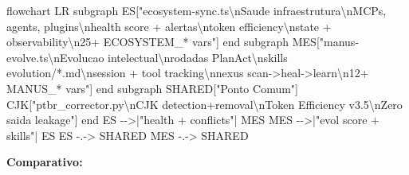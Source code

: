 \documentclass[
  12pt,
]{article}
\newenvironment{Shaded}{}{}
\newcommand{\NormalTok}[1]{#1}
\begin{document}
\begin{Shaded}
\begin{Highlighting}[]
\NormalTok{flowchart LR}
\NormalTok{subgraph ES["ecosystem{-}sync.ts\textbackslash{}nSaude infraestrutura\textbackslash{}nMCPs, agents, plugins\textbackslash{}nhealth score + alertas\textbackslash{}ntoken efficiency\textbackslash{}nstate + observability\textbackslash{}n25+ ECOSYSTEM\_* vars"]}
\NormalTok{end}
\NormalTok{subgraph MES["manus{-}evolve.ts\textbackslash{}nEvolucao intelectual\textbackslash{}nrodadas PlanAct\textbackslash{}nskills evolution/*.md\textbackslash{}nsession + tool tracking\textbackslash{}nnexus scan{-}\textgreater{}heal{-}\textgreater{}learn\textbackslash{}n12+ MANUS\_* vars"]}
\NormalTok{end}
\NormalTok{subgraph SHARED["Ponto Comum"]}
\NormalTok{CJK["ptbr\_corrector.py\textbackslash{}nCJK detection+removal\textbackslash{}nToken Efficiency v3.5\textbackslash{}nZero saida leakage"]}
\NormalTok{end}
\NormalTok{ES {-}{-}\textgreater{}|"health + conflicts"| MES}
\NormalTok{MES {-}{-}\textgreater{}|"evol score + skills"| ES}
\NormalTok{ES {-}.{-}\textgreater{} SHARED}
\NormalTok{MES {-}.{-}\textgreater{} SHARED}
\end{Highlighting}
\end{Shaded}

\textbf{Comparativo:}
\end{document}
